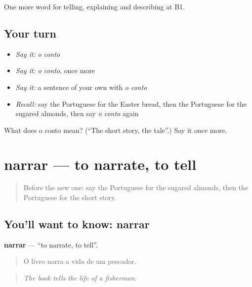 \begin{grammarlens}[title={What you've built}]
One more word for telling, explaining and describing at B1.
\end{grammarlens}

\subsection*{Your turn}
\begin{itemize}
\raggedright
  \item \emph{Say it:} \emph{o conto}
  \item \emph{Say it:} \emph{o conto}, once more
  \item \emph{Say it:} a sentence of your own with \emph{o conto}
  \item \emph{Recall:} say the Portuguese for the Easter bread, then the Portuguese for the sugared almonds, then say \emph{o conto} again
\end{itemize}

\begin{tcolorbox}[breakable,colback=teal!4,colframe=teal!35!black,title={Before you move on}]
What does o conto mean? (\textquotedblleft{}The short story, the tale\textquotedblright{}.) Say it once more.
\end{tcolorbox}
\section[narrar]{narrar — to narrate, to tell}

\label{lesson:PT-C324-narrar}



\begin{quote}
Before the new one: say the Portuguese for the sugared almonds, then the Portuguese for the short story.
\end{quote}

\subsection*{You'll want to know: narrar}
\textbf{narrar} — \textquotedblleft{}to narrate, to tell\textquotedblright{}.

\begin{quote}
O livro narra a vida de um pescador.
\end{quote}

\begin{quote}
\emph{The book tells the life of a fisherman.}
\end{quote}

